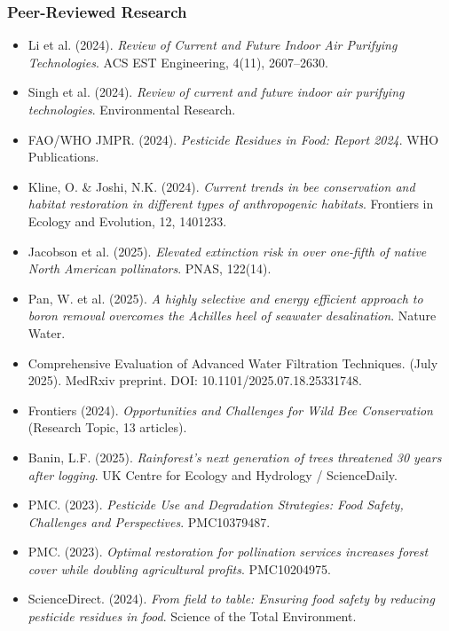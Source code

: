 \documentclass[11pt,letterpaper]{article}
\begin{document}
\subsubsection{Peer-Reviewed Research}
\begin{itemize}[leftmargin=*]
  \item Li et al. (2024). \textit{Review of Current and Future Indoor Air Purifying Technologies}. ACS EST Engineering, 4(11), 2607--2630.
  \item Singh et al. (2024). \textit{Review of current and future indoor air purifying technologies}. Environmental Research.
  \item FAO/WHO JMPR. (2024). \textit{Pesticide Residues in Food: Report 2024}. WHO Publications.
  \item Kline, O. \& Joshi, N.K. (2024). \textit{Current trends in bee conservation and habitat restoration in different types of anthropogenic habitats}. Frontiers in Ecology and Evolution, 12, 1401233.
  \item Jacobson et al. (2025). \textit{Elevated extinction risk in over one-fifth of native North American pollinators}. PNAS, 122(14).
  \item Pan, W. et al. (2025). \textit{A highly selective and energy efficient approach to boron removal overcomes the Achilles heel of seawater desalination}. Nature Water.
  \item Comprehensive Evaluation of Advanced Water Filtration Techniques. (July 2025). MedRxiv preprint. DOI: 10.1101/2025.07.18.25331748.
  \item Frontiers (2024). \textit{Opportunities and Challenges for Wild Bee Conservation} (Research Topic, 13 articles).
  \item Banin, L.F. (2025). \textit{Rainforest's next generation of trees threatened 30 years after logging}. UK Centre for Ecology and Hydrology / ScienceDaily.
  \item PMC. (2023). \textit{Pesticide Use and Degradation Strategies: Food Safety, Challenges and Perspectives}. PMC10379487.
  \item PMC. (2023). \textit{Optimal restoration for pollination services increases forest cover while doubling agricultural profits}. PMC10204975.
  \item ScienceDirect. (2024). \textit{From field to table: Ensuring food safety by reducing pesticide residues in food}. Science of the Total Environment.
\end{itemize}
\end{document}
